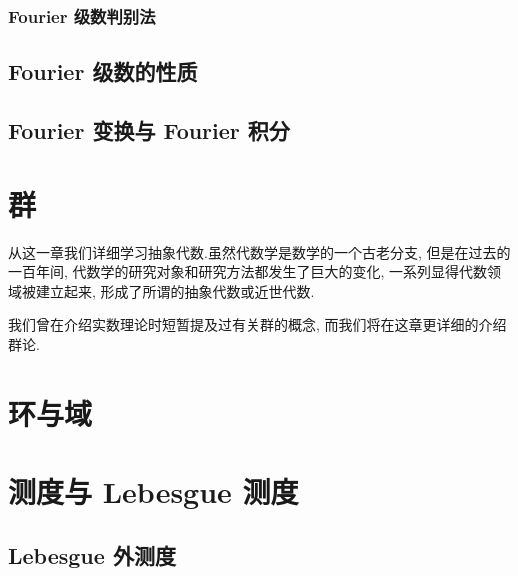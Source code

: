 \documentclass[cn,toc=twocol]{elegantbook}
\begin{document}
\subsection{Fourier 级数判别法}

\section{Fourier 级数的性质}

\section{Fourier 变换与 Fourier 积分}


\chapter{群}

从这一章我们详细学习抽象代数.虽然代数学是数学的一个古老分支, 但是在过去的一百年间, 代数学的研究对象和研究方法都发生了巨大的变化, 一系列显得代数领域被建立起来, 形成了所谓的抽象代数或近世代数.

我们曾在介绍实数理论时短暂提及过有关群的概念, 而我们将在这章更详细的介绍群论.


\chapter{环与域}


\chapter{测度与 Lebesgue 测度}

\section{Lebesgue 外测度}
\end{document}
